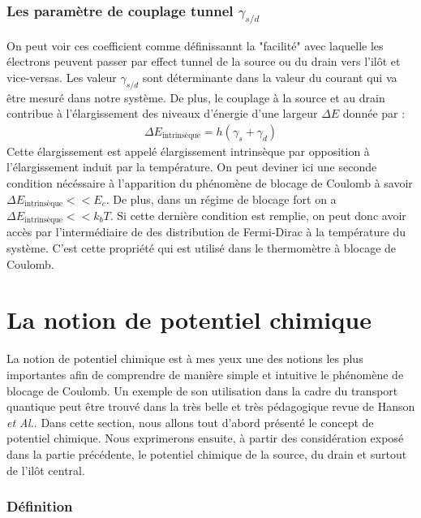 \subsubsection{Les paramètre de couplage tunnel $\gamma_{s/d}$}
On peut voir ces coefficient comme définissannt la "facilité" avec laquelle les électrons peuvent passer par effect tunnel de la source ou du drain vers l'il\^ot et vice-versas. Les valeur $\gamma_{s/d}$ sont déterminante dans la valeur du courant qui va \^etre mesuré dans notre système. De plus, le couplage à la source et au drain contribue à l'élargissement des niveaux d'énergie d'une largeur $\Delta E$ donnée par :
\begin{eqnarray}
\Delta E_{\text{intrinsèque}} = h (\gamma_s + \gamma_d)
\end{eqnarray}
Cette élargissement est appelé élargissement intrinsèque par opposition à l'élargissement induit par la température. On peut deviner ici une seconde condition nécéssaire à l'apparition du phénomène de blocage de Coulomb à savoir $\Delta E_{\text{intrinsèque}} << E_c$. De plus, dans un régime de blocage fort on a $\Delta E_{\text{intrinsèque}} << k_bT$. Si cette dernière condition est remplie, on peut donc avoir accès par l'intermédiaire de des distribution de Fermi-Dirac à la température du système. C'est cette propriété qui est utilisé dans le thermomètre à blocage de Coulomb.





\section{La notion de potentiel chimique}
La notion de potentiel chimique est à mes yeux une des notions les plus importantes afin de comprendre de manière simple et intuitive le phénomène de blocage de Coulomb. Un exemple de son utilisation dans la cadre du transport quantique peut \^etre trouvé dans la très belle et très pédagogique revue de Hanson \textit{et Al.}. Dans cette section, nous allons tout d'abord présenté le concept de potentiel chimique. Nous exprimerons ensuite, à partir des considération exposé dans la partie précédente, le potentiel chimique de la source, du drain et surtout de l'ilôt central.

\subsubsection{Définition}

